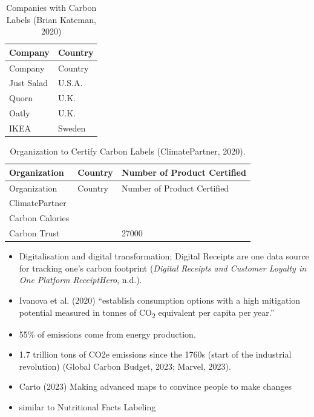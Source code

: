 \documentclass[
  letterpaper,
  DIV=11,
  numbers=noendperiod]{scrartcl}
\begin{document}
\begin{longtable}[]{@{}ll@{}}
\caption{Companies with Carbon Labels (Brian Kateman,
2020)}\tabularnewline
\toprule\noalign{}
Company & Country \\
\midrule\noalign{}
\endfirsthead
\toprule\noalign{}
Company & Country \\
\midrule\noalign{}
\endhead
\bottomrule\noalign{}
\endlastfoot
Just Salad & U.S.A. \\
Quorn & U.K. \\
Oatly & U.K. \\
IKEA & Sweden \\
\end{longtable}

\begin{longtable}[]{@{}lll@{}}
\caption{Organization to Certify Carbon Labels (ClimatePartner,
2020).}\tabularnewline
\toprule\noalign{}
Organization & Country & Number of Product Certified \\
\midrule\noalign{}
\endfirsthead
\toprule\noalign{}
Organization & Country & Number of Product Certified \\
\midrule\noalign{}
\endhead
\bottomrule\noalign{}
\endlastfoot
ClimatePartner & & \\
Carbon Calories & & \\
Carbon Trust & & 27000 \\
\end{longtable}

\begin{itemize}
\item
  Digitalisation and digital transformation; Digital Receipts are one
  data source for tracking one's carbon footprint (\emph{Digital
  Receipts and Customer Loyalty in One Platform {\textbar}
  {ReceiptHero}}, n.d.).
\item
  Ivanova et al. (2020) ``establish consumption options with a high
  mitigation potential measured in tonnes of CO\textsubscript{2}
  equivalent per capita per year.''
\item
  55\% of emissions come from energy production.
\item
  1.7 trillion tons of CO2e emissions since the 1760s (start of the
  industrial revolution) (Global Carbon Budget, 2023; Marvel, 2023).
\item
  Carto (2023) Making advanced maps to convince people to make changes
\item
  similar to Nutritional Facts Labeling
\end{itemize}
\end{document}
